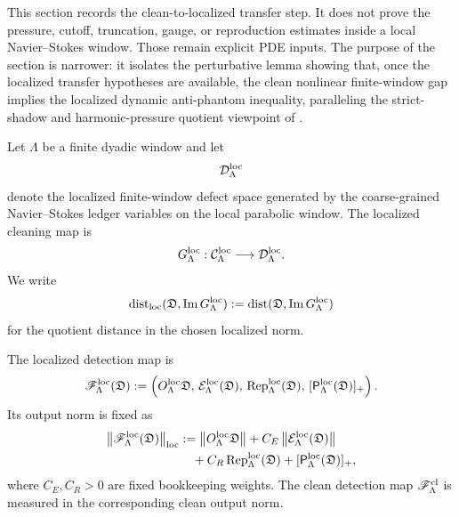 \documentclass[11pt]{article}
\numberwithin{equation}{section}
\newcommand{\Image}{\operatorname{Im}}
\newcommand{\Dist}{\operatorname{dist}}
\begin{document}
This section records the clean-to-localized transfer step.  It does not
prove the pressure, cutoff, truncation, gauge, or reproduction estimates
inside a local Navier--Stokes window.  Those remain explicit PDE inputs.
The purpose of the section is narrower: it isolates the perturbative lemma
showing that, once the localized transfer hypotheses are available, the
clean nonlinear finite-window gap implies the localized dynamic
anti-phantom inequality, paralleling the strict-shadow and harmonic-pressure quotient viewpoint of \cite{Yu2026HarmonicPressure,Yu2026StrictShadows,Yu2026SchurVisibility}.

Let \(\Lambda\) be a finite dyadic window and let
\[
        \mathcal D_\Lambda^{\rm loc}
\]
denote the localized finite-window defect space generated by the
coarse-grained Navier--Stokes ledger variables on the local parabolic
window.  The localized cleaning map is
\[
        G_\Lambda^{\rm loc}:
        \mathcal C_\Lambda^{\rm loc}
        \longrightarrow
        \mathcal D_\Lambda^{\rm loc}.
\]
We write
\[
        \Dist_{\rm loc}(\mathfrak D,\Image G_\Lambda^{\rm loc})
        :=
        \Dist(\mathfrak D,\Image G_\Lambda^{\rm loc})
\]
for the quotient distance in the chosen localized norm.

The localized detection map is
\[
        \mathscr F_\Lambda^{\rm loc}(\mathfrak D)
        :=
        \left(
        O_\Lambda^{\rm loc}\mathfrak D,\,
        \mathcal E_\Lambda^{\rm loc}(\mathfrak D),\,
        \operatorname{Rep}_\Lambda^{\rm loc}(\mathfrak D),\,
        [\mathsf P_\Lambda^{\rm loc}(\mathfrak D)]_+
        \right).
\]
Its output norm is fixed as
\[
\begin{aligned}
        \left\|\mathscr F_\Lambda^{\rm loc}(\mathfrak D)\right\|_{\rm loc}
        &:=
        \left\|O_\Lambda^{\rm loc}\mathfrak D\right\|
        +
        C_E
        \left\|\mathcal E_\Lambda^{\rm loc}(\mathfrak D)\right\|  \\
        &\quad+
        C_R
        \operatorname{Rep}_\Lambda^{\rm loc}(\mathfrak D)
        +
        [\mathsf P_\Lambda^{\rm loc}(\mathfrak D)]_+ ,
\end{aligned}
\]
where \(C_E,C_R>0\) are fixed bookkeeping weights.  The clean detection
map \(\mathscr F_\Lambda^{\rm cl}\) is measured in the corresponding
clean output norm.
\end{document}
